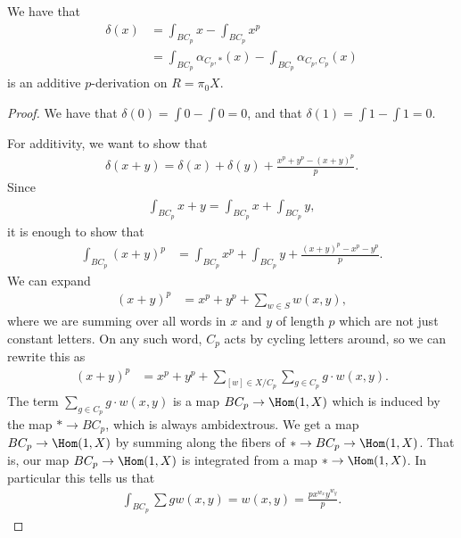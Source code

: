\begin{theorem} We have that
\begin{align*}
    \delta(x) &= \int_{BC_p} x - \int_{BC_p} x^p \\
    &= \int_{BC_p} \alpha_{C_p,\ast}(x) - \int_{BC_p} \alpha_{C_p,C_p}(x)
\end{align*}
is an additive $p$-derivation on $R = \pi_0 X$.
\end{theorem}
\begin{proof} We have that $\delta(0) = \int 0 - \int 0 = 0$, and that $\delta(1) = \int 1 - \int 1 = 0$.

For additivity, we want to show that
\begin{align*}
    \delta(x+y) = \delta(x) + \delta(y) + \frac{x^p + y^p - (x+y)^p}{p}.
\end{align*}
Since
\begin{align*}
    \int_{BC_p} x+y = \int_{BC_p} x + \int_{BC_p} y,
\end{align*}
it is enough to show that 
\begin{align*}
    \int_{BC_p}(x+y)^p &= \int_{BC_p} x^p + \int_{BC_p} y + \frac{(x+y)^p - x^p - y^p}{p}.
\end{align*}
We can expand
\begin{align*}
    (x+y)^p &= x^p + y^p + \sum_{w\in S} w(x,y),
\end{align*}
where we are summing over all words in $x$ and $y$ of length $p$ which are not just constant letters. On any such word, $C_p$ acts by cycling letters around, so we can rewrite this as
\begin{align*}
    (x+y)^p &= x^p + y^p + \sum_{[w]\in X/C_p} \sum_{g\in C_p} g\cdot w(x,y).
\end{align*}
The term $\sum_{g\in C_p} g\cdot w(x,y)$ is a map $BC_p \to \Hom(1,X)$ which is induced by the map $\ast \to BC_p$, which is always ambidextrous. We get a map $BC_p \to \Hom(1,X)$ by summing along the fibers of $\ast \to BC_p \to \Hom(1,X)$. That is, our map $BC_p \to \Hom(1,X)$ is integrated from a map $\ast \to \Hom(1,X)$. In particular this tells us that
\begin{align*}
    \int_{BC_p} \sum g w(x,y) = w(x,y) = \frac{px^{w_x} y^{w_y}}{p}.
\end{align*}
\end{proof}

